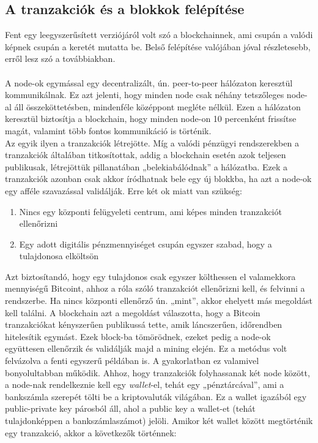 \documentclass[11pt,a4paper]{article}
\newcommand{\q}[1]{„#1''} %
\begin{document}
\subsection{A tranzakciók és a blokkok felépítése}
Fent egy leegyszerűsített verziójáról volt szó a blockchainnek, ami csupán a valódi képnek csupán a keretét mutatta be. Belső felépítése valójában jóval részletesebb, erről lesz szó a továbbiakban.
\\ \\
A node-ok egymással egy decentralizált, ún. peer-to-peer hálózaton keresztül kommunikálnak. Ez azt jelenti, hogy minden node csak néhány tetszőleges node-al áll összeköttetésben, mindenféle középpont megléte nélkül. Ezen a hálózaton keresztül biztosítja a blockchain, hogy minden node-on 10 percenként frissítse magát, valamint több fontos kommunikáció is történik. \\
Az egyik ilyen a tranzakciók létrejötte. Míg a valódi pénzügyi rendszerekben a tranzakciók általában titkosítottak, addig a blockchain esetén azok teljesen publikusak, létrejöttük pillanatában \q{belekiabálódnak} a hálózatba. Ezek a tranzakciók azonban csak akkor íródhatnak bele egy új blokkba, ha azt a node-ok egy afféle szavazással validálják. Erre két ok miatt van szükség:

\begin{enumerate}
    \item Nincs egy központi felügyeleti centrum, ami képes minden tranzakciót ellenőrizni
    \item Egy adott digitális pénzmennyiséget csupán egyszer szabad, hogy a tulajdonosa elköltsön
\end{enumerate}

\noindent Azt biztosítandó, hogy egy tulajdonos csak egyszer költhessen el valamekkora mennyiségű Bitcoint, ahhoz a róla szóló tranzakciót ellenőrizni kell, és felvinni a rendszerbe. Ha nincs központi ellenőrző ún. \q{mint}, akkor ehelyett más megoldást kell találni. A blockchain azt a megoldást válaszotta, hogy a Bitcoin tranzakciókat kényszerűen publikussá tette, amik láncszerűen, időrendben hitelesítik egymást. Ezek block-ba tömörödnek, ezeket pedig a node-ok együttesen ellenőrzik és validálják majd a mining elején. Ez a metódus volt felvázolva a fenti egyszerű példában is. A gyakorlatban ez valamivel bonyolultabban működik. Ahhoz, hogy tranzakciók folyhassanak két node között, a node-nak rendelkeznie kell egy \textit{wallet}-el, tehát egy \q{pénztárcával}, ami a bankszámla szerepét tölti be a kriptovaluták világában. Ez a wallet igazából egy public-private key párosból áll, ahol a public key a wallet-et (tehát tulajdonképpen a bankszámlaszámot) jelöli. Amikor két wallet között megtörténik egy tranzakció, akkor a következők történnek:
\end{document}
